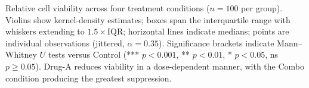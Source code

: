 \caption{Relative cell viability across four treatment conditions ($n = 100$ per group).
Violins show kernel-density estimates; boxes span the interquartile range with whiskers extending to
$1.5\times\text{IQR}$; horizontal lines indicate medians; points are individual observations (jittered, $\alpha = 0.35$).
Significance brackets indicate Mann--Whitney $U$ tests versus Control
(*** $p < 0.001$, ** $p < 0.01$, * $p < 0.05$, ns $p \geq 0.05$).
Drug-A reduces viability in a dose-dependent manner, with the Combo condition producing the greatest suppression.}
